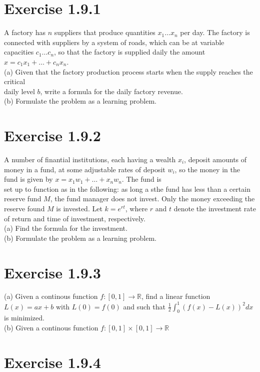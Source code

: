 \documentclass{article}
\begin{document}
\section*{Exercise 1.9.1}


A factory has $n$ suppliers that produce quantities $x_1 \dots x_n$ per day. The factory is connected with suppliers by a system of roads, which
can be at variable capacities $c_1 \dots c_n$, so that the factory is supplied
daily the amount $x = c_1 x_1 + \dots + c_n x_n$.\\
(a) Given that the factory production process starts when the supply reaches the critical \\ 
daily level $b$, write a formula for the daily factory revenue.\\
(b) Formulate the problem as a learning problem.

\section*{Exercise 1.9.2}


A number of finantial institutions, each having a wealth $x_i$, deposit amounts of money in a fund, at some adjustable rates of 
deposit $w_i$, so the money in the fund is given by $x = x_1 w_1 + \dots + x_n w_n$. The fund is \\
set up to function as in the following: as long a sthe fund has less than a certain reserve fund $M$, the fund manager does not invest. Only the
money exceeding the reserve found $M$ is invested. Let $k = e ^ {r t}$, where $r$ and $t$ denote the investment rate of return and time of investment, respectively.\\
(a) Find the formula for the investment. \\
(b) Formulate the problem as a learning problem.

\section*{Exercise 1.9.3}


(a) Given a continous function $f: [0,1] \rightarrow \mathbb{R}$, find a linear function $L(x) = ax + b$ with $L(0) = f(0)$ and such that 
$\frac{1}{2} \int^{1}_{0}(f(x) - L(x))^2 dx$ is minimized.\\
(b) Given a continous function $f: [0,1] \times [0,1] \rightarrow \mathbb{R}$

\section*{Exercise 1.9.4}
\end{document}
